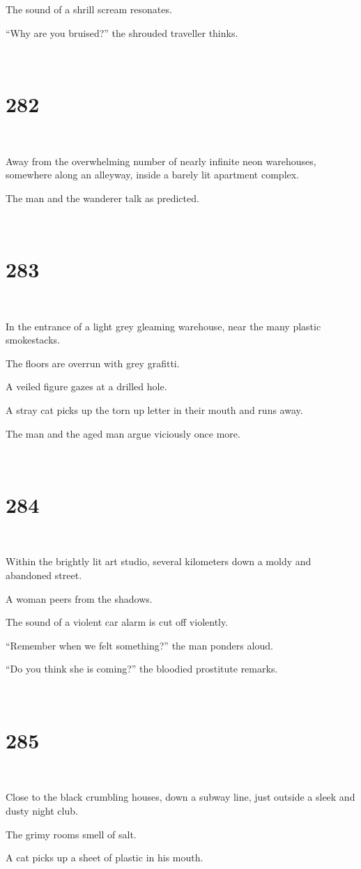 \documentclass{report}
\begin{document}
The sound of a shrill scream resonates.

``Why are you bruised?'' the shrouded traveller thinks.

~
\chapter*{282}
~

Away from the overwhelming number of nearly infinite neon warehouses, somewhere along an alleyway, inside a barely lit apartment complex.

The man and the wanderer talk as predicted.

~
\chapter*{283}
~

In the entrance of a light grey gleaming warehouse, near the many plastic smokestacks.

The floors are overrun with grey grafitti.

A veiled figure gazes at a drilled hole.

A stray cat picks up the torn up letter in their mouth and runs away.

The man and the aged man argue viciously once more.

~
\chapter*{284}
~

Within the brightly lit art studio, several kilometers down a moldy and abandoned street.

A woman peers from the shadows.

The sound of a violent car alarm is cut off violently.

``Remember when we felt something?'' the man ponders aloud.

``Do you think she is coming?'' the bloodied prostitute remarks.

~
\chapter*{285}
~

Close to the black crumbling houses, down a subway line, just outside a sleek and dusty night club.

The grimy rooms smell of salt.

A cat picks up a sheet of plastic in his mouth.
\end{document}

